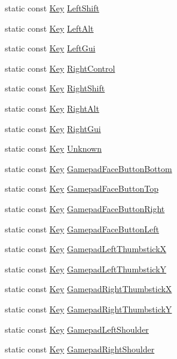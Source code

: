 \begin{DoxyCompactItemize}
static const \hyperlink{classastu_1_1Key}{Key} \hyperlink{classastu_1_1Keys_af85708bc8bd6aeea3d7123c941ce5016}{Left\+Shift}
\item 
static const \hyperlink{classastu_1_1Key}{Key} \hyperlink{classastu_1_1Keys_a579bdde1a0ae91d4c2005fdda205bef4}{Left\+Alt}
\item 
static const \hyperlink{classastu_1_1Key}{Key} \hyperlink{classastu_1_1Keys_a856fc8b34286da1a3d02dfb58875ae84}{Left\+Gui}
\item 
static const \hyperlink{classastu_1_1Key}{Key} \hyperlink{classastu_1_1Keys_ab9133db664bbd1c3d68409db7250ff51}{Right\+Control}
\item 
static const \hyperlink{classastu_1_1Key}{Key} \hyperlink{classastu_1_1Keys_a1c74e28f8295ee404bd096a0cd567956}{Right\+Shift}
\item 
static const \hyperlink{classastu_1_1Key}{Key} \hyperlink{classastu_1_1Keys_ab7f299809e0f6d5c697d36c0413b0065}{Right\+Alt}
\item 
static const \hyperlink{classastu_1_1Key}{Key} \hyperlink{classastu_1_1Keys_a78e3214d5d851b9226cde48f0467bb02}{Right\+Gui}
\item 
static const \hyperlink{classastu_1_1Key}{Key} \hyperlink{classastu_1_1Keys_a5c7baef583dcaaf616f8fa4530c3e6ec}{Unknown}
\item 
static const \hyperlink{classastu_1_1Key}{Key} \hyperlink{classastu_1_1Keys_aa60554a4fee250c6ec7c40cad18d9f45}{Gamepad\+Face\+Button\+Bottom}
\item 
static const \hyperlink{classastu_1_1Key}{Key} \hyperlink{classastu_1_1Keys_adc31c5055ba815e2c895d15e8a784b71}{Gamepad\+Face\+Button\+Top}
\item 
static const \hyperlink{classastu_1_1Key}{Key} \hyperlink{classastu_1_1Keys_a2a8662cb10044288d3c57a667f83d762}{Gamepad\+Face\+Button\+Right}
\item 
static const \hyperlink{classastu_1_1Key}{Key} \hyperlink{classastu_1_1Keys_a7e732832018617f2871c99e3128cb8d9}{Gamepad\+Face\+Button\+Left}
\item 
static const \hyperlink{classastu_1_1Key}{Key} \hyperlink{classastu_1_1Keys_ad2dbb4d3ee2bc68d4ddfd4fcc6a16553}{Gamepad\+Left\+ThumbstickX}
\item 
static const \hyperlink{classastu_1_1Key}{Key} \hyperlink{classastu_1_1Keys_aa605d32f30cfe84cb77c67ddd16a804e}{Gamepad\+Left\+ThumbstickY}
\item 
static const \hyperlink{classastu_1_1Key}{Key} \hyperlink{classastu_1_1Keys_a960344eaf6869e612e04d7f6b27b146a}{Gamepad\+Right\+ThumbstickX}
\item 
static const \hyperlink{classastu_1_1Key}{Key} \hyperlink{classastu_1_1Keys_a4e45200d5551d591c4399a1c11fa4251}{Gamepad\+Right\+ThumbstickY}
\item 
static const \hyperlink{classastu_1_1Key}{Key} \hyperlink{classastu_1_1Keys_aa638ad98f82fbaa9b03b06f5303c1088}{Gamepad\+Left\+Shoulder}
\item 
static const \hyperlink{classastu_1_1Key}{Key} \hyperlink{classastu_1_1Keys_abfed93e7e22b1d9288e287ea4646d3d4}{Gamepad\+Right\+Shoulder}
\end{DoxyCompactItemize}


